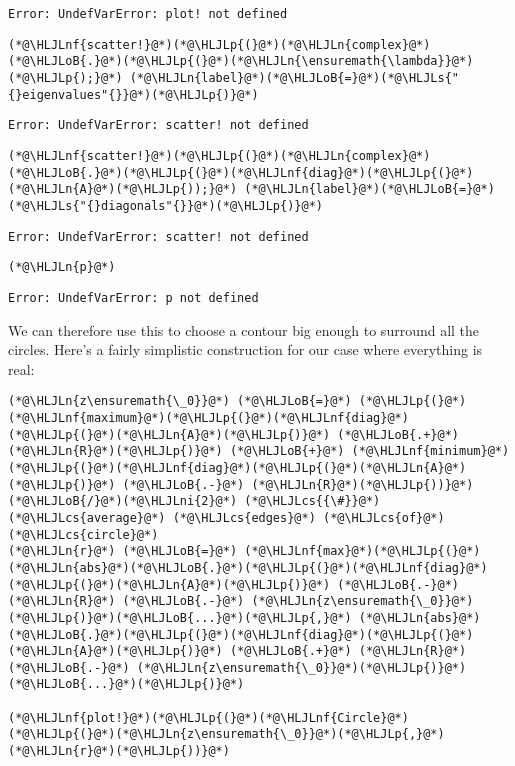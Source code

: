 \documentclass[12pt,a4paper]{article}
\newcommand{\HLJLn}[1]{#1}
\newcommand{\HLJLnf}[1]{\textcolor[RGB]{66,102,213}{#1}}
\newcommand{\HLJLs}[1]{\textcolor[RGB]{201,61,57}{#1}}
\newcommand{\HLJLni}[1]{\textcolor[RGB]{59,151,46}{#1}}
\newcommand{\HLJLoB}[1]{\textcolor[RGB]{102,102,102}{\textbf{#1}}}
\newcommand{\HLJLp}[1]{#1}
\newcommand{\HLJLcs}[1]{\textcolor[RGB]{153,153,119}{\textit{#1}}}
\begin{document}
\begin{lstlisting}
Error: UndefVarError: plot! not defined
\end{lstlisting}


\begin{lstlisting}
(*@\HLJLnf{scatter!}@*)(*@\HLJLp{(}@*)(*@\HLJLn{complex}@*)(*@\HLJLoB{.}@*)(*@\HLJLp{(}@*)(*@\HLJLn{\ensuremath{\lambda}}@*)(*@\HLJLp{);}@*) (*@\HLJLn{label}@*)(*@\HLJLoB{=}@*)(*@\HLJLs{"{}eigenvalues"{}}@*)(*@\HLJLp{)}@*)
\end{lstlisting}

\begin{lstlisting}
Error: UndefVarError: scatter! not defined
\end{lstlisting}


\begin{lstlisting}
(*@\HLJLnf{scatter!}@*)(*@\HLJLp{(}@*)(*@\HLJLn{complex}@*)(*@\HLJLoB{.}@*)(*@\HLJLp{(}@*)(*@\HLJLnf{diag}@*)(*@\HLJLp{(}@*)(*@\HLJLn{A}@*)(*@\HLJLp{));}@*) (*@\HLJLn{label}@*)(*@\HLJLoB{=}@*)(*@\HLJLs{"{}diagonals"{}}@*)(*@\HLJLp{)}@*)
\end{lstlisting}

\begin{lstlisting}
Error: UndefVarError: scatter! not defined
\end{lstlisting}


\begin{lstlisting}
(*@\HLJLn{p}@*)
\end{lstlisting}

\begin{lstlisting}
Error: UndefVarError: p not defined
\end{lstlisting}


We can therefore use this to choose a contour big enough to surround all the circles. Here's a fairly simplistic construction for our case where everything is real:


\begin{lstlisting}
(*@\HLJLn{z\ensuremath{\_0}}@*) (*@\HLJLoB{=}@*) (*@\HLJLp{(}@*)(*@\HLJLnf{maximum}@*)(*@\HLJLp{(}@*)(*@\HLJLnf{diag}@*)(*@\HLJLp{(}@*)(*@\HLJLn{A}@*)(*@\HLJLp{)}@*) (*@\HLJLoB{.+}@*) (*@\HLJLn{R}@*)(*@\HLJLp{)}@*) (*@\HLJLoB{+}@*) (*@\HLJLnf{minimum}@*)(*@\HLJLp{(}@*)(*@\HLJLnf{diag}@*)(*@\HLJLp{(}@*)(*@\HLJLn{A}@*)(*@\HLJLp{)}@*) (*@\HLJLoB{.-}@*) (*@\HLJLn{R}@*)(*@\HLJLp{))}@*) (*@\HLJLoB{/}@*)(*@\HLJLni{2}@*) (*@\HLJLcs{{\#}}@*) (*@\HLJLcs{average}@*) (*@\HLJLcs{edges}@*) (*@\HLJLcs{of}@*) (*@\HLJLcs{circle}@*)
(*@\HLJLn{r}@*) (*@\HLJLoB{=}@*) (*@\HLJLnf{max}@*)(*@\HLJLp{(}@*)(*@\HLJLn{abs}@*)(*@\HLJLoB{.}@*)(*@\HLJLp{(}@*)(*@\HLJLnf{diag}@*)(*@\HLJLp{(}@*)(*@\HLJLn{A}@*)(*@\HLJLp{)}@*) (*@\HLJLoB{.-}@*) (*@\HLJLn{R}@*) (*@\HLJLoB{.-}@*) (*@\HLJLn{z\ensuremath{\_0}}@*)(*@\HLJLp{)}@*)(*@\HLJLoB{...}@*)(*@\HLJLp{,}@*) (*@\HLJLn{abs}@*)(*@\HLJLoB{.}@*)(*@\HLJLp{(}@*)(*@\HLJLnf{diag}@*)(*@\HLJLp{(}@*)(*@\HLJLn{A}@*)(*@\HLJLp{)}@*) (*@\HLJLoB{.+}@*) (*@\HLJLn{R}@*) (*@\HLJLoB{.-}@*) (*@\HLJLn{z\ensuremath{\_0}}@*)(*@\HLJLp{)}@*)(*@\HLJLoB{...}@*)(*@\HLJLp{)}@*)

(*@\HLJLnf{plot!}@*)(*@\HLJLp{(}@*)(*@\HLJLnf{Circle}@*)(*@\HLJLp{(}@*)(*@\HLJLn{z\ensuremath{\_0}}@*)(*@\HLJLp{,}@*) (*@\HLJLn{r}@*)(*@\HLJLp{))}@*)
\end{lstlisting}
\end{document}

